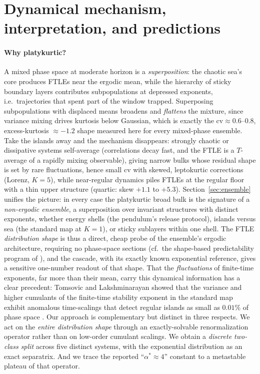 \documentclass[11pt,a4paper]{article}
\theoremstyle{remark}
\newcommand{\cv}{\mathrm{cv}}
\begin{document}
\section{Dynamical mechanism, interpretation, and predictions}\label{sec:mechanism}

\paragraph{Why platykurtic?} A mixed phase space at moderate horizon is a \emph{superposition}: the
chaotic sea's core produces FTLEs near the ergodic mean, while the hierarchy of sticky boundary
layers \cite{zaslavsky,meiss,cristadoro} contributes subpopulations at depressed exponents, i.e.\
trajectories that spent part of the window trapped. Superposing subpopulations with displaced means
broadens and \emph{flattens} the mixture, since variance mixing drives kurtosis below Gaussian,
which is exactly the $\cv \approx 0.6$--$0.8$, excess-kurtosis $\approx -1.2$ shape measured here for
every mixed-phase ensemble. Take the islands away and the mechanism disappears: strongly chaotic or
dissipative systems self-average (correlations decay fast, and the FTLE is a $T$-average of a
rapidly mixing observable), giving narrow bulks whose residual shape is set by rare fluctuations,
hence small $\cv$ with skewed, leptokurtic corrections (Lorenz, $K{=}5$), while near-regular dynamics
piles FTLEs at the regular floor with a thin upper structure (quartic: skew $+1.1$ to $+5.3$).
Section~\ref{sec:ensemble} unifies the picture: in every case the platykurtic broad bulk is the
signature of a \emph{non-ergodic ensemble}, a superposition over invariant structures with distinct
exponents, whether energy shells (the pendulum's release protocol), islands versus sea (the standard
map at $K = 1$), or sticky sublayers within one shell. The FTLE \emph{distribution shape} is thus a
direct, cheap probe of the ensemble's ergodic architecture, requiring no phase-space sections (cf.\
the shape-based predictability program of \cite{vallejo}), and the cascade, with its exactly known
exponential reference, gives a sensitive one-number readout of that shape. That the
\emph{fluctuations} of finite-time exponents, far more than their mean, carry this dynamical
information has a clear precedent: Tomsovic and Lakshminarayan showed that the variance and higher
cumulants of the finite-time stability exponent in the standard map exhibit anomalous time-scalings
that detect regular islands as small as $0.01\%$ of phase space \cite{tomsovic}. Our approach is
complementary but distinct in three respects. We act on the \emph{entire distribution shape} through
an exactly-solvable renormalization operator rather than on low-order cumulant scalings. We obtain a
\emph{discrete two-class split} across five distinct systems, with the exponential distribution as an
exact separatrix. And we trace the reported ``$\alpha^*\approx4$'' constant to a metastable plateau of
that operator.
\end{document}
